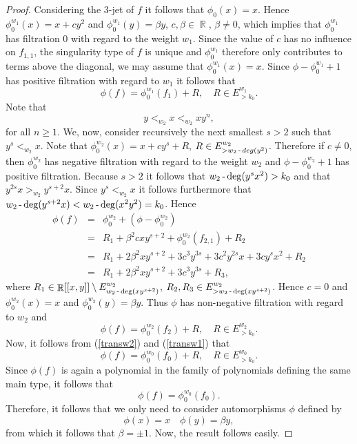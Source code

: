 \documentclass[noend]{amsproc}
\theoremstyle{definition}
\DeclareMathOperator{\R}{\mathbb{R}}
\DeclareMathOperator{\dash}{\textnormal{-}}
\begin{document}
\begin{proof}
Considering the $3$-jet of $f$ it follows that $\phi_0(x)=x$. Hence $\phi_0^{w_1}(x)=x+cy^2$ and $\phi_0^{w_1}(y)=\beta y$, $c,\beta\in\R$, $\beta\neq 0$, which implies that $\phi^{w_1}_0$ has filtration $0$ with regard to the weight $w_1$. Since the value of $c$ has no influence on $f_{1,1}$, the singularity type of $f$ is unique and $\phi_0^{w_1}$ therefore only contributes to terms above the diagonal, we may assume that $\phi_0^{w_1}(x)=x$. Since $\phi-\phi_0^{w_1}+1$ has positive filtration with regard to $w_1$ it follows that 
\begin{equation}\label{transw2}
\phi(f) = \phi_0^{w_1}(f_1) + R,\quad R\in E^{w_1}_{>k_0}.
\end{equation}
Note that 
\begin{equation}\label{orderw1}
y<_{w_2}x<_{w_2}xy^n,
\end{equation}
for all $n\ge 1$. We, now, consider recursively the next smallest $s>2$ such that $y^s<_{w_2}x$. Note that $\phi_0^{w_2}(x)=x+cy^s+R$, $R\in E^{w_2}_{>w_2\dash deg(y^2)}$. Therefore if $c\neq 0$, then $\phi_0^{w_2}$ has negative filtration with regard to the weight $w_2$ and $\phi-\phi_0^{w_2}+1$ has positive filtration. Because $s>2$ it follows that $w_2\dash\deg(y^sx^2)>k_0$ and that $y^{2s}x>_{w_2}y^{s+2}x$. Since $y^s<_{w_2}x$ it follows furthermore that $w_2\dash\deg(y^{s+2}x)<w_2\dash\deg(x^2y^2)=k_0$. Hence
\begin{eqnarray*}
\phi(f) &=& \phi_0^{w_2}+(\phi-\phi_0^{w_2})\\
 &=&  R_1+\beta^2c xy^{s+2}+\phi_0^{w_2}(f_{2,1})+R_2\\
&=&R_1+2\beta^2 xy^{s+2}+ 3 c^3y^{3s}+ 3c^2y^{2s}x+3cy^sx^2+R_2\\
&=&R_1+2\beta^2 xy^{s+2}+ 3c^3y^{3s}+R_3,
\end{eqnarray*}
where $R_1\in\R[[x,y]]\setminus E^{w_2}_{w_2\dash\deg(xy^{s+2})}$, $R_2, R_3\in E^{w_2}_{>w_2\dash\deg(xy^{s+2})}$. Hence $c=0$ and $\phi_0^{w_2}(x)=x$ and $\phi_0^{w_2}(y)=\beta y$. Thus $\phi$ has non-negative filtration with regard to $w_2$ and
\begin{equation}\label{transw1}
\phi(f) = \phi_0^{w_2}(f_2)+R,\quad R\in E^{w_2}_{>k_0}.
\end{equation}
Now, it follows from (\ref{transw2}) and (\ref{transw1}) that 
\begin{equation*}
\phi(f) = \phi_0^{w_0}(f_0)+R,\quad R\in E^{w_0}_{>k_0}.
\end{equation*}
Since $\phi(f)$ is again a polynomial in the family of polynomials defining the same main type, it follows that
\begin{equation*}
\phi(f) = \phi_0^{w_0}(f_0).
\end{equation*}
Therefore, it follows that we only need to consider automorphisms $\phi$ defined by
\[\phi(x)=x\quad \phi(y)=\beta y,\]
from which it follows that $\beta=\pm 1$. Now, the result follows easily.
\end{proof}
\newpage
\end{document}
